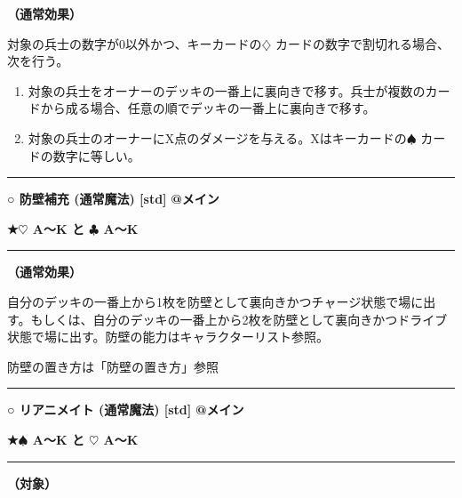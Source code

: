 \documentclass[twocolumn,a5paper,papersize,10pt]{jarticle}
\begin{document}
{\bf（通常効果）}

対象の兵士の数字が0以外かつ、キーカードの{\normalsize $\diamondsuit$} カードの数字で割切れる場合、次を行う。


\vspace{-1zh}%
\begin{enumerate}
\setlength{\leftskip}{-0.3cm}
\setlength{\parskip}{0pt} %

\item 対象の兵士をオーナーのデッキの一番上に裏向きで移す。兵士が複数のカードから成る場合、任意の順でデッキの一番上に裏向きで移す。

\item 対象の兵士のオーナーにX点のダメージを与える。Xはキーカードの{\normalsize $\spadesuit$} カードの数字に等しい。
\vspace{-1zh}%
\end{enumerate}
\vspace{2mm} %
\hrule height 0.5mm depth 0mm width 66.5mm %
\vspace{1mm} %
{\small\bf ○ 防壁補充 {\scriptsize (通常魔法) [std]}} %
\hfill 
{\footnotesize\bf @メイン }

{\footnotesize\bf ★{\normalsize $\heartsuit$} A〜K と {\normalsize $\clubsuit$} A〜K}

\vspace{1mm}%
\hrule height 0.1mm depth 0mm width 66.5mm %
\vspace{1mm}%

{\bf（通常効果）}

自分のデッキの一番上から1枚を防壁として裏向きかつチャージ状態で場に出す。もしくは、自分のデッキの一番上から2枚を防壁として裏向きかつドライブ状態で場に出す。防壁の能力はキャラクターリスト参照。

防壁の置き方は「防壁の置き方」参照
\vspace{2mm} %
\hrule height 0.5mm depth 0mm width 66.5mm %
\vspace{1mm} %
{\small\bf ○ リアニメイト {\scriptsize (通常魔法) [std]}} %
\hfill 
{\footnotesize\bf @メイン }

{\footnotesize\bf ★{\normalsize $\spadesuit$} A〜K と {\normalsize $\heartsuit$} A〜K}

\vspace{1mm}%
\hrule height 0.1mm depth 0mm width 66.5mm %
\vspace{1mm}%
{\bf（対象）}
\end{document}
